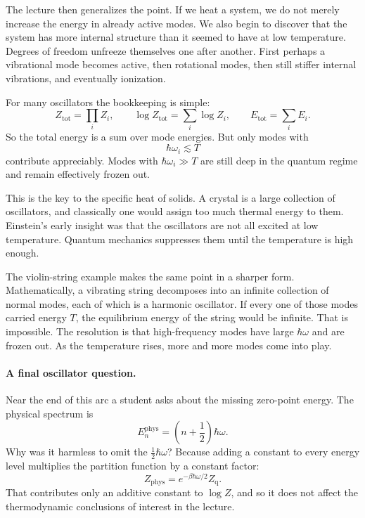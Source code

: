 The lecture then generalizes the point. If we heat a system, we do not merely increase the energy in already active modes. We also begin to discover that the system has more internal structure than it seemed to have at low temperature. Degrees of freedom unfreeze themselves one after another. First perhaps a vibrational mode becomes active, then rotational modes, then still stiffer internal vibrations, and eventually ionization.

For many oscillators the bookkeeping is simple:
\begin{equation}
Z_{\mathrm{tot}}=\prod_i Z_i,
\qquad
\log Z_{\mathrm{tot}}=\sum_i \log Z_i,
\qquad
E_{\mathrm{tot}}=\sum_i E_i.
\end{equation}
So the total energy is a sum over mode energies. But only modes with
\begin{equation}
\hbar\omega_i\lesssim T
\end{equation}
contribute appreciably. Modes with \(\hbar\omega_i\gg T\) are still deep in the quantum regime and remain effectively frozen out.

This is the key to the specific heat of solids. A crystal is a large collection of oscillators, and classically one would assign too much thermal energy to them. Einstein's early insight was that the oscillators are not all excited at low temperature. Quantum mechanics suppresses them until the temperature is high enough.

The violin-string example makes the same point in a sharper form. Mathematically, a vibrating string decomposes into an infinite collection of normal modes, each of which is a harmonic oscillator. If every one of those modes carried energy \(T\), the equilibrium energy of the string would be infinite. That is impossible. The resolution is that high-frequency modes have large \(\hbar\omega\) and are frozen out. As the temperature rises, more and more modes come into play.

\paragraph{A final oscillator question.} Near the end of this arc a student asks about the missing zero-point energy. The physical spectrum is
\begin{equation}
E_n^{\mathrm{phys}}=\left(n+\frac12\right)\hbar\omega.
\end{equation}
Why was it harmless to omit the \(\frac12\hbar\omega\)? Because adding a constant to every energy level multiplies the partition function by a constant factor:
\begin{equation}
Z_{\mathrm{phys}}=e^{-\beta\hbar\omega/2}Z_{\mathrm{q}}.
\end{equation}
That contributes only an additive constant to \(\log Z\), and so it does not affect the thermodynamic conclusions of interest in the lecture.

